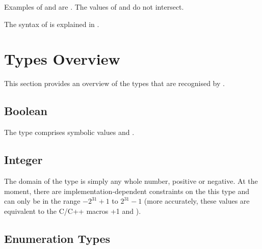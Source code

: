 Examples of  and 
are .
%
The values of  and  do not intersect.

The syntax of  is explained
in .



\section{Types Overview}
\label{Types}

This section provides an overview of the types that are recognised by
\nusmv.

\subsection{Boolean}
\label{Boolean Type}

The \Boolean type comprises symbolic values  and
.

\subsection{Integer}
\label{Integer Type}

%

The domain of the \Integer type is simply any whole number, positive
or negative.
%
At the moment, there are implementation-dependent constraints on the
this type and  can only be in the range
$-2^{31}+1$ to $2^{31}-1$ (more accurately, these values are
equivalent to the C/C++ macros +1 and ).

\subsection{Enumeration Types}
\label{Enumeration Types}

